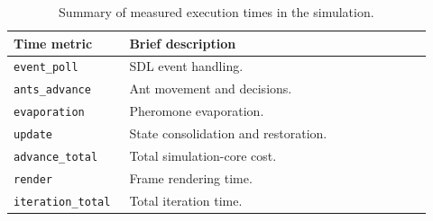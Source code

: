 \begin{table}[htbp]
\centering
\caption{Summary of measured execution times in the simulation.}
\label{tab:timing_summary}
\begin{tabular}{p{0.24\linewidth} p{0.68\linewidth}}
\hline
\textbf{Time metric} & \textbf{Brief description} \\
\hline
\texttt{event\_poll} & SDL event handling. \\
\texttt{ants\_advance} & Ant movement and decisions. \\
\texttt{evaporation} & Pheromone evaporation. \\
\texttt{update} & State consolidation and restoration. \\
\texttt{advance\_total} & Total simulation-core cost. \\
\texttt{render} & Frame rendering time. \\
\texttt{iteration\_total} & Total iteration time. \\
\hline
\end{tabular}
\end{table}